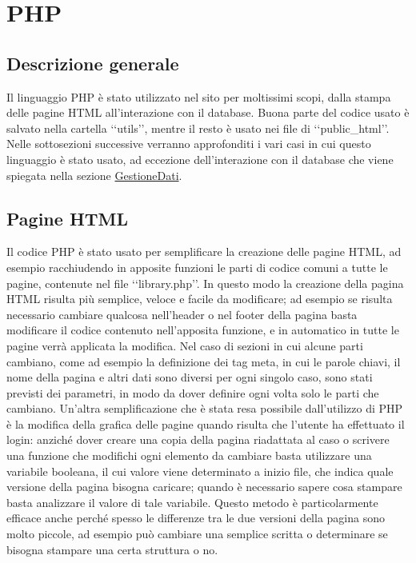 \section{PHP}{
	\subsection{Descrizione generale}{
		Il linguaggio PHP è stato utilizzato nel sito per moltissimi scopi, dalla stampa delle pagine HTML all'interazione con il database. Buona parte del codice usato è salvato nella cartella ‘‘utils’’, mentre il resto è usato nei file di ‘‘public_html’’. Nelle sottosezioni successive verranno approfonditi i vari casi in cui questo linguaggio è stato usato, ad eccezione dell'interazione con il database che viene spiegata nella sezione \hyperref[sec:PHPDB]{GestioneDati}.
	}
	\subsection{Pagine HTML}{
		Il codice PHP è stato usato per semplificare la creazione delle pagine HTML, ad esempio racchiudendo in apposite funzioni le parti di codice comuni a tutte le pagine, contenute nel file ‘‘library.php’’. In questo modo la creazione della pagina HTML risulta più semplice, veloce e facile da modificare; ad esempio se risulta necessario cambiare qualcosa nell'header o nel footer della pagina basta modificare il codice contenuto nell'apposita funzione, e in automatico in tutte le pagine verrà applicata la modifica. Nel caso di sezioni in cui alcune parti cambiano, come ad esempio la definizione dei tag meta, in cui le parole chiavi, il nome della pagina e altri dati sono diversi per ogni singolo caso, sono stati previsti dei parametri, in modo da dover definire ogni volta solo le parti che cambiano.
		Un'altra semplificazione che è stata resa possibile dall'utilizzo di PHP è la modifica della grafica delle pagine quando risulta che l'utente ha effettuato il login: anziché dover creare una copia della pagina riadattata al caso o scrivere una funzione che modifichi ogni elemento da cambiare basta utilizzare una variabile booleana, il cui valore viene determinato a inizio file, che indica quale versione della pagina bisogna caricare; quando è necessario sapere cosa stampare basta analizzare il valore di tale variabile. Questo metodo è particolarmente efficace anche perché spesso le differenze tra le due versioni della pagina sono molto piccole, ad esempio può cambiare una semplice scritta o determinare se bisogna stampare una certa struttura o no.
	}
}
